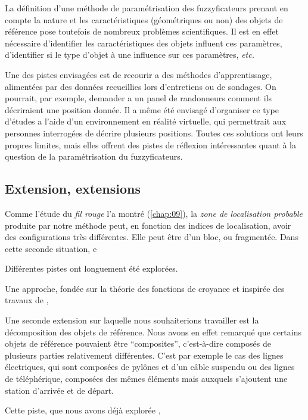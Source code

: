 La définition d'une méthode de paramétrisation des fuzzyficateurs
prenant en compte la nature et les caractéristiques (géométriques ou
non) des objets de référence pose toutefois de nombreux problèmes
scientifiques. Il est en effet nécessaire d'identifier les
caractéristiques des objets influent ces paramètres, d'identifier si
le type d'objet à une influence sur ces paramètres, \emph{etc.}

Une des pistes envisagées est de recourir a des méthodes
d'apprentissage, alimentées par des données recueillies lors
d'entretiens ou de sondages. On pourrait, par exemple, demander a un
panel de randonneurs comment ils décriraient une position donnée. Il a
même été envisagé d'organiser ce type d'études a l'aide d'un
environnement en réalité virtuelle, qui permettrait aux personnes
interrogées de décrire plusieurs positions. Toutes ces solutions ont
leurs propres limites, mais elles offrent des pistes de réflexion
intéressantes quant à la question de la paramétrisation du
fuzzyficateurs.

\subsection*{Extension, extensions}


Comme l'étude du \emph{fil rouge} l'a montré (\autoref{chap:09}), la
\emph{zone de localisation probable} produite par notre méthode peut,
en fonction des indices de localisation, avoir des configurations très
différentes. Elle peut être d'un bloc, ou fragmentée. Dans cette
seconde situation,  e


Différentes pistes ont longuement été explorées.

Une approche, fondée sur la théorie des fonctions de croyance
\autocite{Shafer1976} et inspirée des travaux de
\textcite{Olteanu2008},


Une seconde extension sur laquelle nous souhaiterions travailler est
la décomposition des objets de référence. Nous avons en effet remarqué
que certains objets de référence pouvaient être \enquote{composites},
c'est-à-dire composés de plusieurs parties relativement
différentes. C'est par exemple le cas des lignes électriques, qui sont
composées de pylônes et d'un câble suspendu ou des lignes de
téléphérique, composées des mêmes éléments mais auxquels s'ajoutent
une station d'arrivée et de départ.

Cette piste, que nous avons
déjà explorée \autocite{Bunel2019a},

